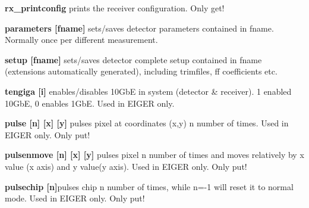 \begin{DoxyItemize}
\item {\bfseries rx\_\-printconfig} prints the receiver configuration. Only get!
\end{DoxyItemize}


\begin{DoxyItemize}
\item {\bfseries parameters \mbox{[}fname\mbox{]}} sets/saves detector parameters contained in fname. Normally once per different measurement.
\end{DoxyItemize}


\begin{DoxyItemize}
\item {\bfseries setup \mbox{[}fname\mbox{]}} sets/saves detector complete setup contained in fname (extensions automatically generated), including trimfiles, ff coefficients etc.
\end{DoxyItemize}


\begin{DoxyItemize}
\item {\bfseries tengiga \mbox{[}i\mbox{]}} enables/disables 10GbE in system (detector \& receiver). 1 enabled 10GbE, 0 enables 1GbE. Used in EIGER only.
\end{DoxyItemize}


\begin{DoxyItemize}
\item {\bfseries pulse \mbox{[}n\mbox{]} \mbox{[}x\mbox{]} \mbox{[}y\mbox{]}} pulses pixel at coordinates (x,y) n number of times. Used in EIGER only. Only put!
\end{DoxyItemize}


\begin{DoxyItemize}
\item {\bfseries pulsenmove \mbox{[}n\mbox{]} \mbox{[}x\mbox{]} \mbox{[}y\mbox{]}} pulses pixel n number of times and moves relatively by x value (x axis) and y value(y axis). Used in EIGER only. Only put!
\end{DoxyItemize}


\begin{DoxyItemize}
\item {\bfseries pulsechip \mbox{[}n\mbox{]}}pulses chip n number of times, while n=-\/1 will reset it to normal mode. Used in EIGER only. Only put! 
\end{DoxyItemize}
